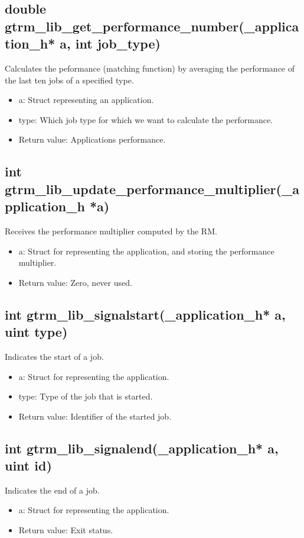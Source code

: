 \documentclass[nobiblatex]{LTHthesis}
\begin{document}
\subsection{double gtrm\_lib\_get\_performance\_number(\_application\_h* a, int job\_type)}
Calculates the peformance (matching function) by averaging the performance of the last ten jobs of a specified type.
\begin{itemize}
\item a: Struct representing an application.
\item type: Which job type for which we want to calculate the performance.
\item Return value: Applications performance.
\end{itemize}

\subsection{int gtrm\_lib\_update\_performance\_multiplier(\_application\_h *a)}
Receives the performance multiplier computed by the RM.
\begin{itemize}
\item a: Struct for representing the application, and storing the performance multiplier.
\item Return value: Zero, never used.
\end{itemize}

\subsection{int gtrm\_lib\_signalstart(\_application\_h* a, uint type)}
Indicates the start of a job.
\begin{itemize}
\item a: Struct for representing the application.

\item type: Type of the job that is started.
\item Return value: Identifier of the started job.
\end{itemize}

\subsection{int gtrm\_lib\_signalend(\_application\_h* a, uint id)}
Indicates the end of a job.
\begin{itemize}
\item a: Struct for representing the application.
\item Return value: Exit status.
\end{itemize}
\end{document}
